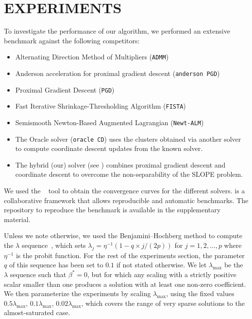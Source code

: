 \section{EXPERIMENTS}\label{sec:experiments}

To investigate the performance of our algorithm, we performed an extensive benchmark against the following competitors:
\begin{itemize}[noitemsep]
  \item Alternating Direction Method of Multipliers (\texttt{ADMM})~\parencite{boyd2010}
  \item Anderson acceleration for proximal gradient descent (\texttt{anderson PGD})~\parencite{zhang2020}
  \item Proximal Gradient Descent (\texttt{PGD})~\parencite{combettes2005}
  \item Fast Iterative Shrinkage-Thresholding Algorithm (\texttt{FISTA})~\parencite{beck2009}
  \item Semismooth Newton-Based Augmented Lagrangian (\texttt{Newt-ALM})~\parencite{Ziyan2019}
  \item The Oracle solver (\texttt{oracle CD}) uses the clusters obtained via another
        solver to compute coordinate descent updates from the known solver.
  \item The hybrid (our) solver (see ) combines proximal gradient descent
        and coordinate descent to overcome the non-separability of the SLOPE problem.
\end{itemize}

We used the ~\parencite{moreau2022benchopt} tool to obtain the convergence curves for the different solvers.
 is a collaborative framework that allows reproducible and automatic benchmarks.
The repository to reproduce the benchmark is available in the supplementary material.

Unless we note otherwise, we used the Benjamini--Hochberg method to compute the \(\lambda\) sequence~\parencite{bogdan2015},
which sets $\lambda_j = \eta^{-1}(1 - q\times j / (2p))$ for $j=1, 2, \hdots, p$ where $\eta^{-1}$ is the probit function.
For the rest of the experiments section, the parameter $q$ of this sequence has been set to $0.1$ if not stated otherwise.
We let \(\lambda_\text{max}\) be the \(\lambda\) sequence such that \(\beta^* = 0\), but for which any scaling with a strictly positive scalar smaller than one produces a solution with at least one non-zero coefficient.
We then parameterize the experiments by scaling \(\lambda_\text{max}\), using the fixed values \(0.5 \lambda_\text{max}\), \(0.1 \lambda_\text{max}\), \(0.02 \lambda_\text{max}\), which covers the range of very sparse solutions to the almost-saturated case.

